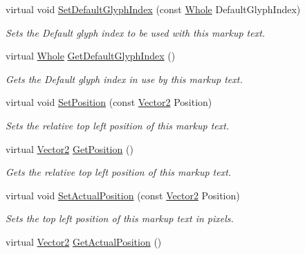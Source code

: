 \begin{DoxyCompactItemize}
virtual void \hyperlink{classphys_1_1UI_1_1MarkupText_a6f0b087fca1b75a5005652ccd31a77a1}{SetDefaultGlyphIndex} (const \hyperlink{namespacephys_a460f6bc24c8dd347b05e0366ae34f34a}{Whole} DefaultGlyphIndex)
\begin{DoxyCompactList}\small\item\em Sets the Default glyph index to be used with this markup text. \item\end{DoxyCompactList}\item 
virtual \hyperlink{namespacephys_a460f6bc24c8dd347b05e0366ae34f34a}{Whole} \hyperlink{classphys_1_1UI_1_1MarkupText_a02872d0b9828b34e9b2ceec82cce237b}{GetDefaultGlyphIndex} ()
\begin{DoxyCompactList}\small\item\em Gets the Default glyph index in use by this markup text. \item\end{DoxyCompactList}\item 
virtual void \hyperlink{classphys_1_1UI_1_1MarkupText_aa4a71db4811506968086105e3126731c}{SetPosition} (const \hyperlink{classphys_1_1Vector2}{Vector2} Position)
\begin{DoxyCompactList}\small\item\em Sets the relative top left position of this markup text. \item\end{DoxyCompactList}\item 
virtual \hyperlink{classphys_1_1Vector2}{Vector2} \hyperlink{classphys_1_1UI_1_1MarkupText_a9d92f03e1cad181a5d8f20f3f95cf7cc}{GetPosition} ()
\begin{DoxyCompactList}\small\item\em Gets the relative top left position of this markup text. \item\end{DoxyCompactList}\item 
virtual void \hyperlink{classphys_1_1UI_1_1MarkupText_a0b6e052e1b592b66bc7fd923f975b7ef}{SetActualPosition} (const \hyperlink{classphys_1_1Vector2}{Vector2} Position)
\begin{DoxyCompactList}\small\item\em Sets the top left position of this markup text in pixels. \item\end{DoxyCompactList}\item 
virtual \hyperlink{classphys_1_1Vector2}{Vector2} \hyperlink{classphys_1_1UI_1_1MarkupText_a1e5bfba8d1686cb4188793fd695c7090}{GetActualPosition} ()

\end{DoxyCompactItemize}
